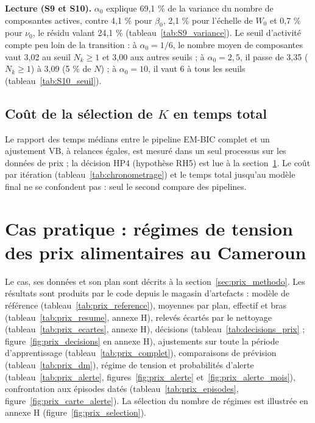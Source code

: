 
\textbf{Lecture (S9 et S10). }$\alpha_0$ explique 69,1 \% de la variance du nombre de composantes actives, contre 4,1 \% pour $\beta_0$, 2,1 \% pour l'échelle de $W_0$ et 0,7 \% pour $\nu_0$, le résidu valant 24,1 \% (tableau~\ref{tab:S9_variance}). Le seuil d'activité compte peu loin de la transition : à $\alpha_0 = 1/6$, le nombre moyen de composantes vaut 3,02 au seuil $N_k \geq 1$ et 3,00 aux autres seuils ; à $\alpha_0 = 2{,}5$, il passe de 3,35 ($N_k \geq 1$) à 3,09 (5 \% de $N$) ; à $\alpha_0 = 10$, il vaut 6 à tous les seuils (tableau~\ref{tab:S10_seuil}).

\subsection{Coût de la sélection de $K$ en temps total}\label{sec:res_cout}
Le rapport des temps médians entre le pipeline EM-BIC complet et un ajustement VB, à relances égales, est mesuré dans un seul processus sur les données de prix ; la décision HP4 (hypothèse RH5) est lue à la section~\ref{sec:res_prix}. Le coût par itération (tableau~\ref{tab:chronometrage}) et le temps total jusqu'au modèle final ne se confondent pas : seul le second compare des pipelines.

\section{Cas pratique : régimes de tension des prix alimentaires au Cameroun}\label{sec:res_prix}
Le cas, ses données et son plan sont décrits à la section~\ref{sec:prix_methodo}. Les résultats sont produits par le code depuis le magasin d'artefacts : modèle de référence (tableau~\ref{tab:prix_reference}), moyennes par plan, effectif et bras (tableau~\ref{tab:prix_resume}, annexe H), relevés écartés par le nettoyage (tableau~\ref{tab:prix_ecartes}, annexe H), décisions (tableau~\ref{tab:decisions_prix} ; figure~\ref{fig:prix_decisions} en annexe H), ajustements sur toute la période d'apprentissage (tableau~\ref{tab:prix_complet}), comparaisons de prévision (tableau~\ref{tab:prix_dm}), régime de tension et probabilités d'alerte (tableau~\ref{tab:prix_alerte}, figures~\ref{fig:prix_alerte} et~\ref{fig:prix_alerte_mois}), confrontation aux épisodes datés (tableau~\ref{tab:prix_episodes}, figure~\ref{fig:prix_carte_alerte}). La sélection du nombre de régimes est illustrée en annexe H (figure~\ref{fig:prix_selection}).

